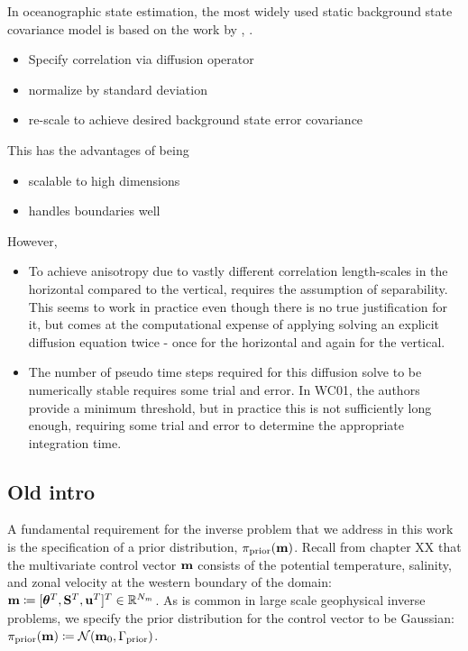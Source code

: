 In oceanographic state estimation, the most widely used static background state
covariance model is based on the work by \citet[][WC01
hereafter]{weaver_correlation_2001},
\citep[e.g.][]{forgetECCOv4,nguyen_arctic_2021,mazloff_eddy-permitting_2010,moore_regional_2011-1}.
\begin{itemize}
    \item Specify correlation via diffusion operator
    \item normalize by standard deviation
    \item re-scale to achieve desired background state error covariance
\end{itemize}
This has the advantages of being
\begin{itemize}
    \item scalable to high dimensions
    \item handles boundaries well
\end{itemize}
However,
\begin{itemize}
    \item To achieve anisotropy due to vastly different correlation
        length-scales in the horizontal compared to the vertical, requires the
        assumption of separability. This seems to work in practice even though
        there is no true justification for it, but comes at the computational
        expense of applying
        solving an explicit diffusion equation twice - once for the horizontal
        and again for the vertical.
    \item The number of pseudo time steps required for this diffusion solve to
        be numerically stable requires some trial and error. In WC01, the
        authors provide a minimum threshold, but in practice this is not
        sufficiently long enough, requiring some trial and error to determine
        the appropriate integration time.
\end{itemize}



\subsection{Old intro}
A fundamental requirement for the inverse problem that we address in this work
is the specification of a prior distribution, $\pi_{\text{prior}}(\mathbf{m})$.
Recall from chapter XX that the multivariate control vector
$\mathbf{m}$ consists of the
potential temperature, salinity, and zonal velocity at the western boundary of
the domain:
$\mathbf{m} \coloneqq [{\bm{\theta}}^T,\mathbf{S}^T,\mathbf{u}^T]^T \in\mathbb{R}^{N_m}$.
As is common in large scale geophysical inverse problems, we specify the prior
distribution for the control vector
to be Gaussian: $\pi_{\text{prior}}(\mathbf{m}) \coloneqq \mathcal{N}(\mathbf{m}_0, \Gamma_{\text{prior}})$.

